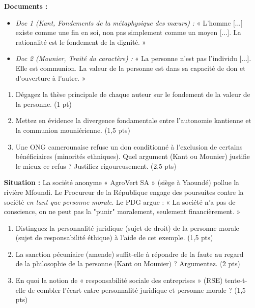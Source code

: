 \documentclass[11pt]{article}
\begin{document}
\begin{exercice}
\textbf{Documents :}
\begin{itemize}
    \item \textit{Doc 1 (Kant, Fondements de la métaphysique des mœurs) :} « L'homme [...] existe comme une fin en soi, non pas simplement comme un moyen [...]. La rationalité est le fondement de la dignité. »
    \item \textit{Doc 2 (Mounier, Traité du caractère) :} « La personne n'est pas l'individu [...]. Elle est communion. La valeur de la personne est dans sa capacité de don et d'ouverture à l'autre. »
\end{itemize}
\begin{enumerate}
    \item Dégagez la thèse principale de chaque auteur sur le fondement de la valeur de la personne. (1 pt)
    \item Mettez en évidence la divergence fondamentale entre l'autonomie kantienne et la communion mouniérienne. (1,5 pts)
    \item Une ONG camerounaise refuse un don conditionné à l'exclusion de certains bénéficiaires (minorités ethniques). Quel argument (Kant ou Mounier) justifie le mieux ce refus ? Justifiez rigoureusement. (2,5 pts)
\end{enumerate}
\end{exercice}

\begin{exercice}
\textbf{Situation :} La société anonyme « AgroVert SA » (siège à Yaoundé) pollue la rivière Mfoundi. Le Procureur de la République engage des poursuites contre la société \textit{en tant que personne morale}. Le PDG argue : « La société n'a pas de conscience, on ne peut pas la "punir" moralement, seulement financièrement. »
\begin{enumerate}
    \item Distinguez la personnalité juridique (sujet de droit) de la personne morale (sujet de responsabilité éthique) à l'aide de cet exemple. (1,5 pts)
    \item La sanction pécuniaire (amende) suffit-elle à répondre de la faute au regard de la philosophie de la personne (Kant ou Mounier) ? Argumentez. (2 pts)
    \item En quoi la notion de « responsabilité sociale des entreprises » (RSE) tente-t-elle de combler l'écart entre personnalité juridique et personne morale ? (1,5 pts)
\end{enumerate}
\end{exercice}
\end{document}
